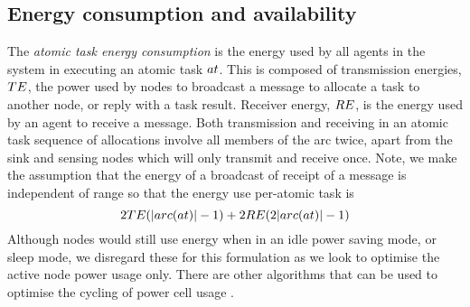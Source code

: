\subsection{Energy consumption and availability}
The \textit{atomic task energy consumption} is the energy used by all agents in the system in executing an atomic task $\varAtomicTask{}{}$. This is composed of transmission energies, $TE$, the power used by nodes to  broadcast a message to allocate a task to another node, or reply with a task result. Receiver energy, $RE$, is the energy used by an agent to receive a message. Both transmission and receiving in an atomic task sequence of allocations involve all members of the arc twice, apart from the sink and sensing nodes which will only transmit and receive once. Note, we make the assumption that the energy of a broadcast of receipt of a message is independent of range so that the energy use per-atomic task is
\begin{equation}
2\varTransmissionEnergy{}{} (\funcSize{\functionTaskArc{}{}}{} - 1)
	+ 2\varReceiverEnergy{}{} (2 \funcSize{\functionTaskArc{}{}}{} - 1)
\end{equation}
Although nodes would still use energy when in an idle power saving mode, or sleep mode, we disregard these for this formulation as we look to optimise the active node power usage only. There are other algorithms that can be used to optimise the cycling of power cell usage \citep{Escolar2014}.

\newcommand{\formalAgentEnergyAvailable}[2]{
	\functionFormal{fae}
	{\setAgents{}{}}
	{\setRealNumbersUnit{}{}}
}
\newcommand{\functionAgentEnergyAvailable}[2]{
	\functionSignature{fae_{\varTime{}{}}}
	{\varAgent{}{}}
}
\newcommand{\functionEnergyVariability}[2]{
	\ifx \\#1\\
	\functionSignature{rev_{\varTime{}{}}}
	{\setAgents{}{}}
	\else
	\functionSignature{rev_{\varTime{}{}}}{#1}
	\fi
}

